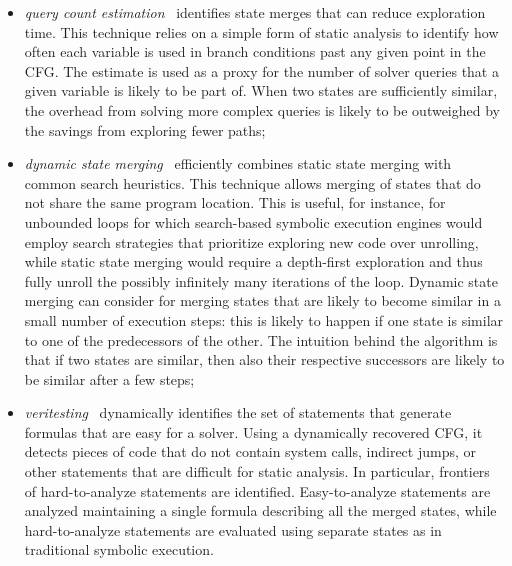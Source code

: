 \begin{itemize}

  \item {\em query count estimation}~\cite{KKB-PLDI12} identifies state merges that can reduce exploration time. This technique relies on a simple form of static analysis to identify how often each variable is used in branch conditions past any given point in the CFG. The estimate is used as a proxy for the number of solver queries that a given variable is likely to be part of. When two states are sufficiently similar, the overhead from solving more complex queries is likely to be outweighed by the savings from exploring fewer paths;

  \item {\em dynamic state merging}~\cite{KKB-PLDI12} efficiently combines static state merging with common search heuristics. This technique allows merging of states that do not share the same program location. This is useful, for instance, for unbounded loops for which search-based symbolic execution engines would employ search strategies that prioritize exploring new code over unrolling, while static state merging would require a depth-first exploration and thus fully unroll the possibly infinitely many iterations of the loop. Dynamic state merging can consider for merging states that are likely to become similar in a small number of execution steps: this is likely to happen if one state is similar to one of the predecessors of the other. The intuition behind the algorithm is that if two states are similar, then also their respective successors are likely to be similar after a few steps;

  \item {\em veritesting}~\cite{VERITESTING-ICSE14} dynamically identifies  the set of statements that generate formulas that are easy for a solver. Using a dynamically recovered CFG, it detects pieces of code that do not contain system calls, indirect jumps, or other statements that are difficult for static analysis. In particular, frontiers of hard-to-analyze statements are identified.  Easy-to-analyze statements are analyzed maintaining a single formula describing all the merged states, while hard-to-analyze statements are evaluated using separate states as in traditional symbolic execution.

\end{itemize}

